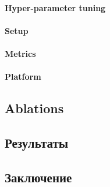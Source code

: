 \paragraph{Hyper-parameter tuning} %
\paragraph{Setup} %
\paragraph{Metrics} %
\paragraph{Platform} %

\subsection{Ablations}



\subsection{Результаты}

\subsection{Заключение}

